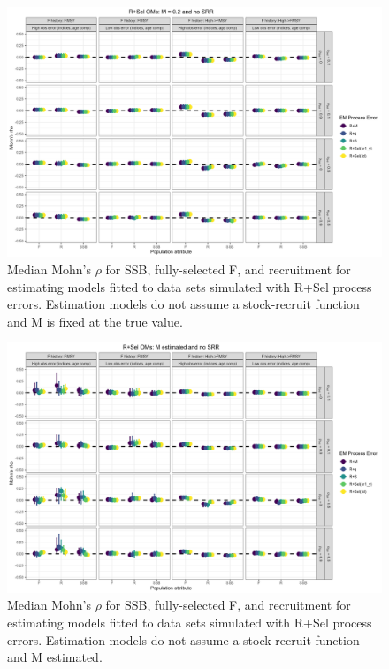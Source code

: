 \documentclass[
  12pt,
]{article}
\begin{document}
\begin{landscape}
\begin{figure}
\caption{Median Mohn's $\rho$ for SSB, fully-selected F, and recruitment for estimating models fitted to data sets simulated with R+Sel process errors.  Estimation models do not assume a stock-recruit function and M is fixed at the true value.}\label{Sel_om_em_R_MF_mohns_rho}
\begin{center}
\includegraphics[width = \textwidth]{Sel_om_mohns_rho_R_MF.png}
\end{center}
\end{figure}
\end{landscape}

\begin{landscape}
\begin{figure}
\caption{Median Mohn's $\rho$ for SSB, fully-selected F, and recruitment for estimating models fitted to data sets simulated with R+Sel process errors.  Estimation models do not assume a stock-recruit function and M estimated.}\label{Sel_om_em_R_ME_mohns_rho}
\begin{center}
\includegraphics[width = \textwidth]{Sel_om_mohns_rho_R_ME.png}
\end{center}
\end{figure}
\end{landscape}
\end{document}
